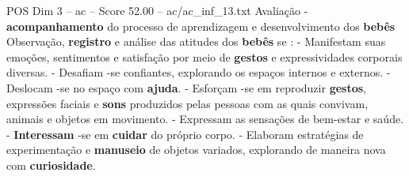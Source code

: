 \begin{textsample}{POS Dim 3 – ac – Score 52.00 – ac/ac\_inf\_13.txt}
Avaliação - \textbf{acompanhamento} do processo de aprendizagem e desenvolvimento dos \textbf{bebês} Observação, \textbf{registro} e análise das atitudes dos \textbf{bebês} se : - Manifestam suas emoções, sentimentos e satisfação por meio de \textbf{gestos} e expressividades corporais diversas. - Desafiam -se confiantes, explorando os espaços internos e externos. - Deslocam -se no espaço com \textbf{ajuda}. - Esforçam -se em reproduzir \textbf{gestos}, expressões faciais e \textbf{sons} produzidos pelas pessoas com as quais convivam, animais e objetos em movimento. - Expressam as sensações de bem-estar e saúde. - \textbf{Interessam} -se em \textbf{cuidar} do próprio corpo. - Elaboram estratégias de experimentação e \textbf{manuseio} de objetos variados, explorando de maneira nova com \textbf{curiosidade}.

\end{textsample}

